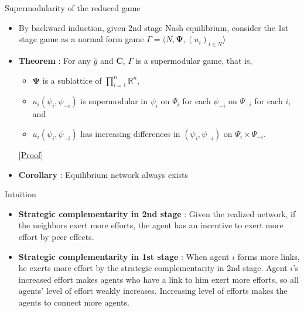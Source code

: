 \documentclass[10pt,dvipdfmx]{beamer}
\begin{document}
\begin{frame}[label=theorem]{Supermodularity of the reduced game}
\begin{itemize}
    \item By backward induction, given 2nd stage Nash equilibrium, consider the 1st stage game as a normal form game $\Gamma = \langle N, \bm{\Psi}, {(u_i)}_{i \in N} \rangle$
    \item {\bf{Theorem}} : For any $\overline{g}$ and $\bm{C}$, $\Gamma$ is a supermodular game, that is,
        \begin{itemize}
            \item $\bm{\Psi}$ is a sublattice of $\prod_{i=1}^n \mathbb{R}^n$, 
            \item $u_i(\psi_i, \psi_{-i})$ is supermodular in $\psi_i$ on $\Psi_i$ for each $\psi_{-i}$ on $\Psi_{-i}$ for each $i$, and
            \item $u_i(\psi_i, \psi_{-i})$ has increasing differences in $(\psi_i, \psi_{-i})$ on $\Psi_i \times \Psi_{-i}$.
        \end{itemize}
        \hyperlink{proof}{[Proof]}
    \item {\bf{Corollary}} : Equilibrium network always exists
\end{itemize}
\end{frame}

\begin{frame}{Intuition}
\begin{itemize}
    \item {\bf{Strategic complementarity in 2nd stage}} : Given the realized network, if the neighbors exert more efforts, the agent has an incentive to exert more effort by peer effects.
    \item {\bf{Strategic complementarity in 1st stage}} : When agent $i$ forms more links, he exerts more effort by the strategic complementarity in 2nd stage. Agent $i$'s increased effort makes agents who have a link to him exert more efforts, so all agents' level of effort weakly increases. Increasing level of efforts makes the agents to connect more agents.
\end{itemize}
\end{frame}
\end{document}
